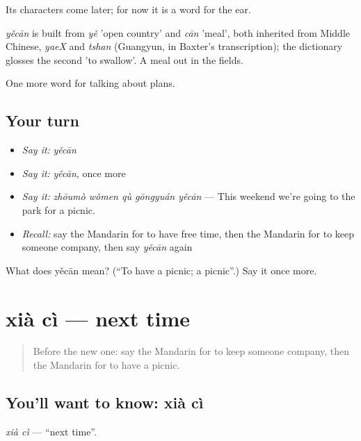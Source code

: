 Its characters come later; for now it is a word for the ear.

\begin{cousinweb}
\emph{yěcān} is built from \emph{yě} 'open country' and \emph{cān} 'meal', both inherited from Middle Chinese, \emph{yaeX} and \emph{tshan} (Guangyun, in Baxter's transcription); the dictionary glosses the second 'to swallow'. A meal out in the fields.
\end{cousinweb}

\begin{grammarlens}[title={What you've built}]
One more word for talking about plans.
\end{grammarlens}

\subsection*{Your turn}
\begin{itemize}
\raggedright
  \item \emph{Say it:} \emph{yěcān}
  \item \emph{Say it:} \emph{yěcān}, once more
  \item \emph{Say it:} \emph{zhōumò wǒmen qù gōngyuán yěcān} — This weekend we're going to the park for a picnic.
  \item \emph{Recall:} say the Mandarin for to have free time, then the Mandarin for to keep someone company, then say \emph{yěcān} again
\end{itemize}

\begin{tcolorbox}[breakable,colback=teal!4,colframe=teal!35!black,title={Before you move on}]
What does yěcān mean? (\textquotedblleft{}To have a picnic; a picnic\textquotedblright{}.) Say it once more.
\end{tcolorbox}
\section[xià cì]{xià cì — next time}

\label{lesson:ZH-C163-xiaci}



\begin{quote}
Before the new one: say the Mandarin for to keep someone company, then the Mandarin for to have a picnic.
\end{quote}

\subsection*{You'll want to know: xià cì}
\emph{xià cì} — \textquotedblleft{}next time\textquotedblright{}.

